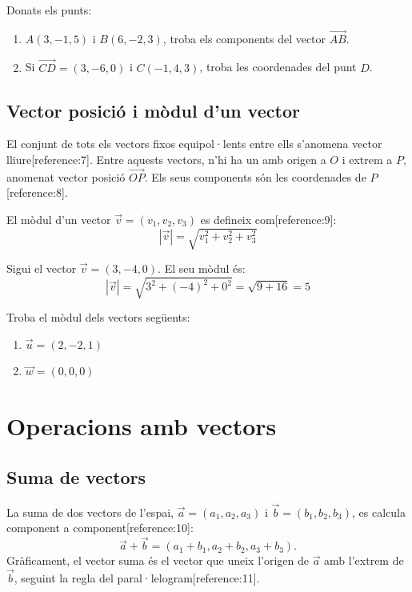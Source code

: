 \documentclass[12pt]{article}
\begin{document}
\begin{exercici}
Donats els punts:
\begin{enumerate}
    \item $A(3, -1, 5)$ i $B(6, -2, 3)$, troba els components del vector $\overrightarrow{AB}$.
    \item Si $\overrightarrow{CD} = (3, -6, 0)$ i $C(-1, 4, 3)$, troba les coordenades del punt $D$.
\end{enumerate}
\end{exercici}

\subsection{Vector posició i mòdul d'un vector}

\begin{concept}
El conjunt de tots els vectors fixos equipol·lents entre ells s'anomena vector lliure[reference:7]. Entre aquests vectors, n'hi ha un amb origen a $O$ i extrem a $P$, anomenat vector posició $\overrightarrow{OP}$. Els seus components són les coordenades de $P$[reference:8].

El mòdul d'un vector $\vec{v} = (v_1, v_2, v_3)$ es defineix com[reference:9]:
\[
|\vec{v}| = \sqrt{v_1^2 + v_2^2 + v_3^2}
\]
\end{concept}

\begin{exemple}
Sigui el vector $\vec{v} = (3, -4, 0)$. El seu mòdul és:
\[
|\vec{v}| = \sqrt{3^2 + (-4)^2 + 0^2} = \sqrt{9 + 16} = 5
\]
\end{exemple}

\begin{exercici}
Troba el mòdul dels vectors següents:
\begin{enumerate}
    \item $\vec{u} = (2, -2, 1)$
    \item $\vec{w} = (0, 0, 0)$
\end{enumerate}
\end{exercici}

\section{Operacions amb vectors}

\subsection{Suma de vectors}

\begin{concept}
La suma de dos vectors de l'espai, $\vec{a} = (a_1, a_2, a_3)$ i $\vec{b} = (b_1, b_2, b_3)$, es calcula component a component[reference:10]:
\[
\vec{a} + \vec{b} = (a_1 + b_1, a_2 + b_2, a_3 + b_3).
\]
Gràficament, el vector suma és el vector que uneix l'origen de $\vec{a}$ amb l'extrem de $\vec{b}$, seguint la regla del paral·lelogram[reference:11].
\end{concept}
\end{document}
